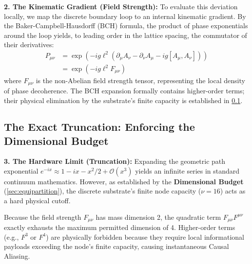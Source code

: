 \textbf{2. The Kinematic Gradient (Field Strength):} 
To evaluate this deviation locally, we map the discrete boundary loop to an internal kinematic gradient. By the Baker-Campbell-Hausdorff (BCH) formula, the product of phase exponentials around the loop yields, to leading order in the lattice spacing, the commutator of their derivatives:
\begin{equation}
\begin{split}
    P_{\mu\nu} &= \exp\left( -ig \ell^2 (\partial_\mu A_\nu - \partial_\nu A_\mu - ig[A_\mu, A_\nu]) \right) \\
    &= \exp\left( -ig \ell^2 F_{\mu\nu} \right)
\end{split}
\end{equation}
where $F_{\mu\nu}$ is the non-Abelian field strength tensor, representing the local density of phase decoherence. The BCH expansion formally contains higher-order terms; their physical elimination by the substrate's finite capacity is established in \cref{sec:exact_truncation}.

\subsection{The Exact Truncation: Enforcing the Dimensional Budget}
\label{sec:exact_truncation}

\textbf{3. The Hardware Limit (Truncation):}
Expanding the geometric path exponential $e^{-ix} \approx 1 - ix - x^2/2 + \mathcal{O}(x^3)$ yields an infinite series in standard continuum mathematics. However, as established by the \textbf{Dimensional Budget} (\cref{sec:equipartition}), the discrete substrate's finite node capacity ($\nu=16$) acts as a hard physical cutoff. 

Because the field strength $F_{\mu\nu}$ has mass dimension 2, the quadratic term $F_{\mu\nu}F^{\mu\nu}$ exactly exhausts the maximum permitted dimension of 4. Higher-order terms (e.g., $F^3$ or $F^4$) are physically forbidden because they require local informational payloads exceeding the node's finite capacity, causing instantaneous Causal Aliasing. 

